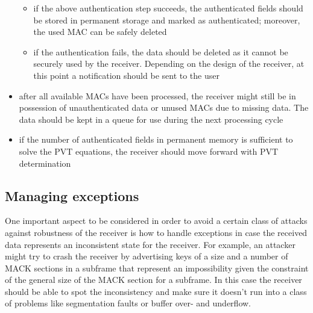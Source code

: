 \begin{itemize}
\begin{itemize}
      \item if the above authentication step succeeds, the authenticated fields
        should be stored in permanent storage and marked as authenticated;
        moreover, the used MAC can be safely deleted
      \item if the authentication fails, the data should be deleted as it cannot
        be securely used by the receiver. Depending on the design of the
        receiver, at this point a notification should be sent to the user
    \end{itemize}
  \item after all available MACs have been processed, the receiver might still
    be in possession of unauthenticated data or unused MACs due to missing data.
    The data should be kept in a queue for use during the next processing cycle
  \item if the number of authenticated fields in permanent memory is sufficient
    to solve the PVT equations, the receiver should move forward with PVT
    determination
\end{itemize}

\subsection{Managing exceptions}
One important aspect to be considered in order to avoid a certain class of
attacks against robustness of the receiver is how to handle exceptions in case
the received data represents an inconsistent state for the receiver. For
example, an attacker might try to crash the receiver by advertising keys of a
size and a number of MACK sections in a subframe that represent an impossibility
given the constraint of the general size of the MACK section for a subframe. In
this case the receiver should be able to spot the inconsistency and make sure it
doesn't run into a class of problems like segmentation faults or buffer over-
and underflow.

